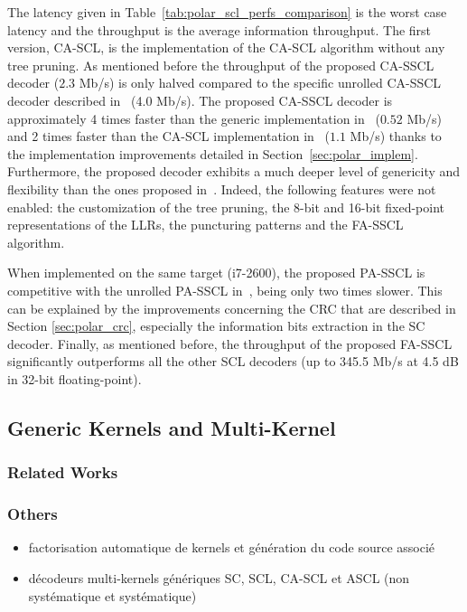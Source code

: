 The latency given in Table~\ref{tab:polar_scl_perfs_comparison} is the worst
case latency and the throughput is the average information throughput. The first
version, CA-SCL, is the implementation of the CA-SCL algorithm without any tree
pruning. As mentioned before the throughput of the proposed CA-SSCL decoder
($2.3$ Mb/s) is only halved compared to the specific unrolled CA-SSCL decoder
described in~\cite{Sarkis2016} (4.0 Mb/s). The proposed CA-SSCL decoder is
approximately 4 times faster than the generic implementation
in~\cite{Sarkis2014b} ($0.52$ Mb/s) and 2 times faster than the CA-SCL
implementation in~\cite{Shen2016} ($1.1$ Mb/s) thanks to the implementation
improvements detailed in Section~\ref{sec:polar_implem}.
Furthermore, the proposed decoder exhibits a much deeper level of genericity and
flexibility than the ones proposed in~\cite{Sarkis2014,Shen2016}. Indeed, the
following features were not enabled: the customization of the tree pruning, the
8-bit and 16-bit fixed-point representations of the LLRs, the puncturing
patterns and the FA-SSCL algorithm.

When implemented on the same target (i7-2600), the proposed PA-SSCL is
competitive with the unrolled PA-SSCL in~\cite{Sarkis2016}, being only two times
slower. This can be explained by the improvements concerning the CRC that are
described in Section \ref{sec:polar_crc}, especially the information bits
extraction in the SC decoder. Finally, as mentioned before, the throughput of
the proposed FA-SSCL significantly outperforms all the other SCL decoders (up to
345.5 Mb/s at 4.5 dB in 32-bit floating-point).

\subsection{Generic Kernels and Multi-Kernel}

\subsubsection{Related Works}

\subsubsection{Others}

\begin{itemize}
  \item factorisation automatique de kernels et génération du code source
    associé
  \item décodeurs multi-kernels génériques SC, SCL, CA-SCL et ASCL (non
    systématique et systématique)
\end{itemize}

